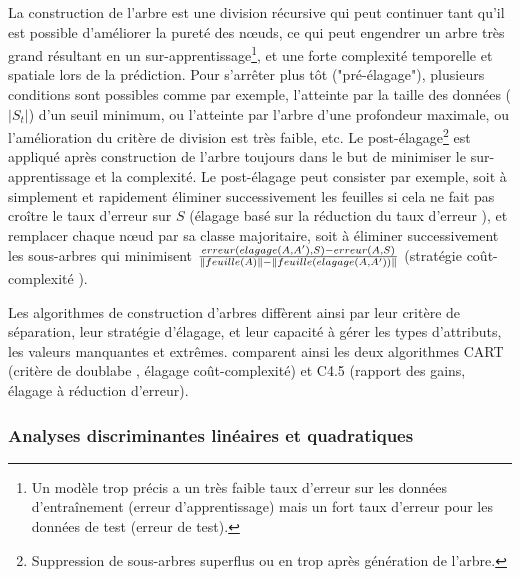 La construction de l'arbre est une division récursive qui peut continuer tant qu'il est possible d'améliorer la pureté des nœuds, ce qui peut engendrer un arbre très grand résultant en un sur-apprentissage\footnote{Un modèle trop précis a un très faible taux d'erreur sur les données d'entraînement (erreur d'apprentissage) mais un fort taux d'erreur pour les données de test (erreur de test).}, et une forte complexité temporelle et spatiale lors de la prédiction. Pour s'arrêter plus tôt ("pré-élagage"), plusieurs conditions sont possibles comme par exemple, l'atteinte par la taille des données ($\vert S_t \vert$) d'un seuil minimum, ou l'atteinte par l'arbre d'une profondeur maximale, ou l'amélioration du critère de division est très faible, etc. Le post-élagage\footnote{Suppression de sous-arbres superflus ou en trop après génération de l'arbre.} est appliqué après construction de l'arbre toujours dans le but de minimiser le sur-apprentissage et la complexité. Le post-élagage peut consister par exemple, soit à simplement et rapidement éliminer successivement les feuilles si cela  ne fait pas croître le taux d'erreur sur $S$ (\og élagage basé sur la réduction du taux d'erreur \fg{}), et remplacer chaque nœud par sa classe majoritaire, soit à éliminer successivement les sous-arbres qui minimisent $\frac{erreur(elagage(A, A'), S) - erreur(A, S)}{\left\lVert feuille(A)\right\rVert - \left\lVert feuille(elagage(A, A'))\right\rVert}$ (\og stratégie coût-complexité \fg{}). 

Les algorithmes de construction d'arbres diffèrent ainsi par leur critère de séparation, leur stratégie d'élagage, et leur capacité à gérer les types d'attributs, les valeurs manquantes et extrêmes. \citet{singh2014id3cartc45} comparent ainsi les deux algorithmes CART (critère de \og doublabe \fg{}, élagage coût-complexité) et C4.5 (rapport des gains, élagage à réduction d'erreur).

\subsubsection{Analyses discriminantes linéaires et quadratiques}

